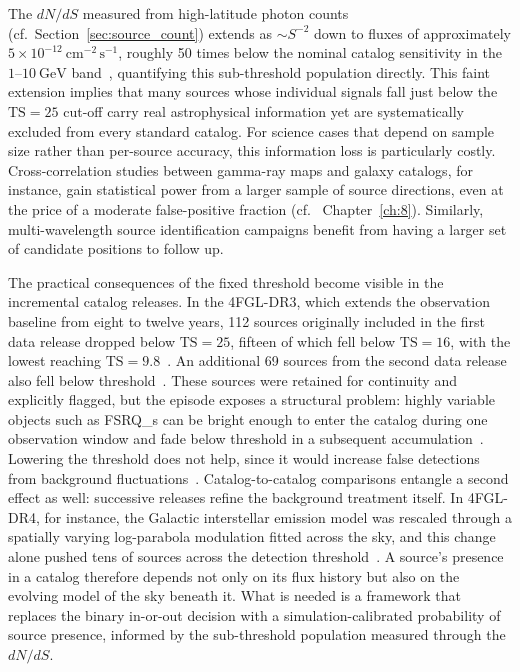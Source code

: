 The $dN/dS$ measured from high-latitude photon counts (cf.\ Section~\ref{sec:source_count}) extends as $\sim S^{-2}$ down to fluxes of approximately $5 \times 10^{-12}~\mathrm{cm}^{-2}\,\mathrm{s}^{-1}$, roughly 50 times below the nominal catalog sensitivity in the $1$--$10~\mathrm{GeV}$ band~\cite{Korsmeier:2022cwp}, quantifying this sub-threshold population directly.
This faint extension implies that many sources whose individual signals fall just below the $\mathrm{TS} = 25$ cut-off carry real astrophysical information yet are systematically excluded from every standard catalog.
For science cases that depend on sample size rather than per-source accuracy, this information loss is particularly costly.
Cross-correlation studies between gamma-ray maps and galaxy catalogs, for instance, gain statistical power from a larger sample of source directions, even at the price of a moderate false-positive fraction (cf.
\ Chapter~\ref{ch:8}).
Similarly, multi-wavelength source identification campaigns benefit from having a larger set of candidate positions to follow up.

The practical consequences of the fixed threshold become visible in the incremental catalog releases.
In the 4FGL-DR3, which extends the observation baseline from eight to twelve years, 112 sources originally included in the first data release dropped below $\mathrm{TS} = 25$, fifteen of which fell below $\mathrm{TS} = 16$, with the lowest reaching $\mathrm{TS} = 9.8$~\cite{Fermi-LAT:2022byn}.
An additional 69 sources from the second data release also fell below threshold~\cite{Fermi-LAT:2022byn}.
These sources were retained for continuity and explicitly flagged, but the episode exposes a structural problem: highly variable objects such as \glspl{FSRQ_} can be bright enough to enter the catalog during one observation window and fade below threshold in a subsequent accumulation~\cite{Bhat:2022}.
Lowering the threshold does not help, since it would increase false detections from background fluctuations~\cite{Bhat:2022}.
Catalog-to-catalog comparisons entangle a second effect as well: successive releases refine the background treatment itself. In 4FGL-DR4, for instance, the Galactic interstellar emission model was rescaled through a spatially varying log-parabola modulation fitted across the sky, and this change alone pushed tens of sources across the detection threshold~\cite{Ballet:2023qzs}. A source's presence in a catalog therefore depends not only on its flux history but also on the evolving model of the sky beneath it.
What is needed is a framework that replaces the binary in-or-out decision with a simulation-calibrated probability of source presence, informed by the sub-threshold population measured through the $dN/dS$.
